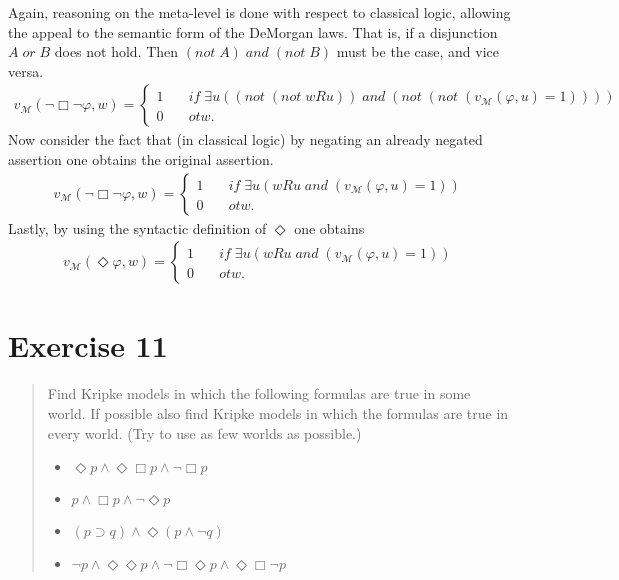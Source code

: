 \documentclass[11pt,a4paper]{article}
\newcommand{\lto}{\supset}
\newcommand{\some}{\Diamond}
\newcommand{\all}{\Box}
\begin{document}
Again, reasoning on the meta-level is done with respect to classical logic, allowing the appeal to the semantic form of the DeMorgan laws. That is, if a disjunction $A \; or \; B$ does not hold. Then $(not \; A) \; and \; (not \; B)$ must be the case, and vice versa. 
\begin{equation*}
\begin{split}
v_{\mathcal{M}}(\neg \all \neg \varphi, w)=
\begin{cases}
1 & \quad \mathit{if}  \;  \exists u  ( (not \; (not \; wRu)) \; and \; (not \;(not \; (v_{\mathcal{M}}(\varphi, u)=1)))) \\
0 & \quad otw.
\end{cases}
\end{split}
\end{equation*}
Now consider the fact that (in classical logic) by negating an already negated assertion one obtains the original assertion.
\begin{equation*}
\begin{split}
v_{\mathcal{M}}(\neg \all \neg \varphi, w)=
\begin{cases}
1 & \quad \mathit{if}  \;  \exists u  (  wRu \; and \;  (v_{\mathcal{M}}(\varphi, u)=1)) \\
0 & \quad otw.
\end{cases}
\end{split}
\end{equation*}
Lastly, by using the syntactic definition of $\some$ one obtains
\begin{equation*}
\begin{split}
v_{\mathcal{M}}(\some \varphi, w)=
\begin{cases}
1 & \quad \mathit{if}  \;  \exists u  (  wRu \; and \;  (v_{\mathcal{M}}(\varphi, u)=1)) \\
0 & \quad otw.
\end{cases}
\end{split}
\end{equation*}

\section*{Exercise 11}
\begin{quote}
Find Kripke models in which the following formulas are true in some world. If possible also find Kripke models in which the formulas are true in every world.
(Try to use as few worlds as possible.)
\begin{itemize}
\item $\some p \land \some \all p \land \neg \all p$
\item $p \land \all p \land \neg \some p$
\item $(p \lto q) \land \some (p \land \neg q)$
\item $\neg p \land \some \some p \land \neg \all \some p \land \some \all  \neg p$
\end{itemize}
\end{quote}
\end{document}

